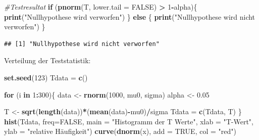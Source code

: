 \documentclass[]{article}
\newenvironment{Shaded}{\begin{snugshade}}{\end{snugshade}}
\newcommand{\CommentTok}[1]{\textcolor[rgb]{0.56,0.35,0.01}{\textit{#1}}}
\newcommand{\ControlFlowTok}[1]{\textcolor[rgb]{0.13,0.29,0.53}{\textbf{#1}}}
\newcommand{\DataTypeTok}[1]{\textcolor[rgb]{0.13,0.29,0.53}{#1}}
\newcommand{\DecValTok}[1]{\textcolor[rgb]{0.00,0.00,0.81}{#1}}
\newcommand{\FloatTok}[1]{\textcolor[rgb]{0.00,0.00,0.81}{#1}}
\newcommand{\KeywordTok}[1]{\textcolor[rgb]{0.13,0.29,0.53}{\textbf{#1}}}
\newcommand{\NormalTok}[1]{#1}
\newcommand{\OperatorTok}[1]{\textcolor[rgb]{0.81,0.36,0.00}{\textbf{#1}}}
\newcommand{\OtherTok}[1]{\textcolor[rgb]{0.56,0.35,0.01}{#1}}
\newcommand{\StringTok}[1]{\textcolor[rgb]{0.31,0.60,0.02}{#1}}
\begin{document}
\begin{Shaded}
\begin{Highlighting}[]
\CommentTok{#Testresultat}
\ControlFlowTok{if}\NormalTok{ (}\KeywordTok{pnorm}\NormalTok{(T, }\DataTypeTok{lower.tail =} \OtherTok{FALSE}\NormalTok{) }\OperatorTok{>}\StringTok{ }\DecValTok{1}\OperatorTok{-}\NormalTok{alpha)\{}
  \KeywordTok{print}\NormalTok{(}\StringTok{"Nullhypothese wird verworfen"}\NormalTok{)}
\NormalTok{\} }\ControlFlowTok{else}\NormalTok{ \{}
  \KeywordTok{print}\NormalTok{(}\StringTok{"Nullhypothese wird nicht verworfen"}\NormalTok{)}
\NormalTok{\}}
\end{Highlighting}
\end{Shaded}

\begin{verbatim}
## [1] "Nullhypothese wird nicht verworfen"
\end{verbatim}

Verteilung der Teststatistik:

\begin{Shaded}
\begin{Highlighting}[]
\KeywordTok{set.seed}\NormalTok{(}\DecValTok{123}\NormalTok{)}
\NormalTok{Tdata =}\StringTok{ }\KeywordTok{c}\NormalTok{()}

\ControlFlowTok{for}\NormalTok{ (i }\ControlFlowTok{in} \DecValTok{1}\OperatorTok{:}\DecValTok{300}\NormalTok{)\{}
\NormalTok{  data <-}\StringTok{ }\KeywordTok{rnorm}\NormalTok{(}\DecValTok{1000}\NormalTok{, mu0, sigma)}
\NormalTok{  alpha <-}\StringTok{ }\FloatTok{0.05}

\NormalTok{  T <-}\StringTok{ }\KeywordTok{sqrt}\NormalTok{(}\KeywordTok{length}\NormalTok{(data))}\OperatorTok{*}\NormalTok{(}\KeywordTok{mean}\NormalTok{(data)}\OperatorTok{-}\NormalTok{mu0)}\OperatorTok{/}\NormalTok{sigma}
\NormalTok{  Tdata =}\StringTok{ }\KeywordTok{c}\NormalTok{(Tdata, T)}
\NormalTok{\}}
\KeywordTok{hist}\NormalTok{(Tdata, }\DataTypeTok{freq=}\OtherTok{FALSE}\NormalTok{, }\DataTypeTok{main =} \StringTok{"Histogramm der T Werte"}\NormalTok{, }\DataTypeTok{xlab =} \StringTok{"T-Wert"}\NormalTok{, }\DataTypeTok{ylab =} \StringTok{"relative Häufigkeit"}\NormalTok{)}
\KeywordTok{curve}\NormalTok{(}\KeywordTok{dnorm}\NormalTok{(x), }\DataTypeTok{add =} \OtherTok{TRUE}\NormalTok{, }\DataTypeTok{col =} \StringTok{"red"}\NormalTok{)}
\end{Highlighting}
\end{Shaded}
\end{document}
